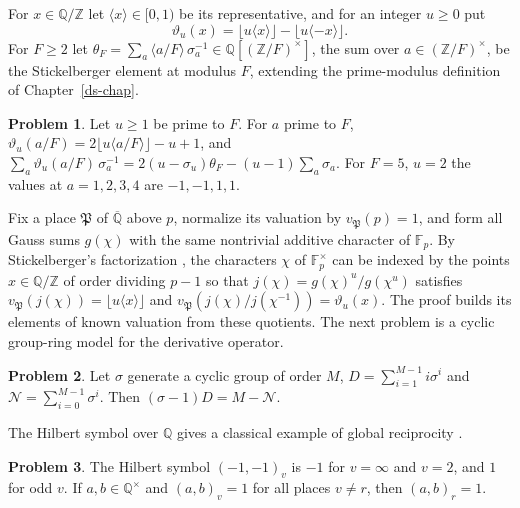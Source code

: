 \documentclass[reqno]{amsart}
\newcounter{chap}
\theoremstyle{definition}
\newtheorem{problem}{Problem}[section]
\theoremstyle{plain}
\newcommand{\Z}{\mathbb{Z}}
\newcommand{\Q}{\mathbb{Q}}
\newcommand{\F}{\mathbb{F}}
\newcommand{\Pp}{\mathfrak{P}}
\begin{document}
For \(x\in\Q/\Z\) let \(\langle x\rangle\in[0,1)\) be its representative, and for an integer \(u\ge0\) put
\[
 \vartheta_u(x)=\lfloor u\langle x\rangle\rfloor-\lfloor u\langle -x\rangle\rfloor .
\]
For \(F\ge2\) let \(\theta_F=\sum_a\langle a/F\rangle\,\sigma_a^{-1}\in\Q[(\Z/F)^\times]\), the sum over \(a\in(\Z/F)^\times\), be the Stickelberger element at modulus \(F\), extending the prime-modulus definition of Chapter~\ref{ds-chap}.

\begin{problem}\label{pr:theta}
Let \(u\ge1\) be prime to \(F\).  For \(a\) prime to \(F\), \(\vartheta_u(a/F)=2\lfloor u\langle a/F\rangle\rfloor-u+1\), and \(\sum_a\vartheta_u(a/F)\,\sigma_a^{-1}=2(u-\sigma_u)\theta_F-(u-1)\sum_a\sigma_a\).  For \(F=5\), \(u=2\) the values at \(a=1,2,3,4\) are \(-1,-1,1,1\).
\end{problem}

Fix a place \(\Pp\) of \(\overline{\Q}\) above \(p\), normalize its valuation by \(v_\Pp(p)=1\), and form all Gauss sums \(g(\chi)\) with the same nontrivial additive character of \(\F_p\).  By Stickelberger's factorization \cite[Ch.~6]{Wa}, the characters \(\chi\) of \(\F_p^\times\) can be indexed by the points \(x\in\Q/\Z\) of order dividing \(p-1\) so that \(j(\chi)=g(\chi)^u/g(\chi^u)\) satisfies \(v_\Pp(j(\chi))=\lfloor u\langle x\rangle\rfloor\) and \(v_\Pp(j(\chi)/j(\chi^{-1}))=\vartheta_u(x)\).  The proof builds its elements of known valuation from these quotients.  The next problem is a cyclic group-ring model for the derivative operator.

\begin{problem}\label{pr:derivative}
Let \(\sigma\) generate a cyclic group of order \(M\), \(D=\sum_{i=1}^{M-1}i\sigma^i\) and \(\mathcal N=\sum_{i=0}^{M-1}\sigma^i\).  Then \((\sigma-1)D=M-\mathcal N\).
\end{problem}

The Hilbert symbol over \(\Q\) gives a classical example of global reciprocity \cite[Ch.~III]{Se}.

\begin{problem}\label{pr:hilbert}
The Hilbert symbol \((-1,-1)_v\) is \(-1\) for \(v=\infty\) and \(v=2\), and \(1\) for odd \(v\).  If \(a,b\in\Q^\times\) and \((a,b)_v=1\) for all places \(v\ne r\), then \((a,b)_r=1\).
\end{problem}
\end{document}

